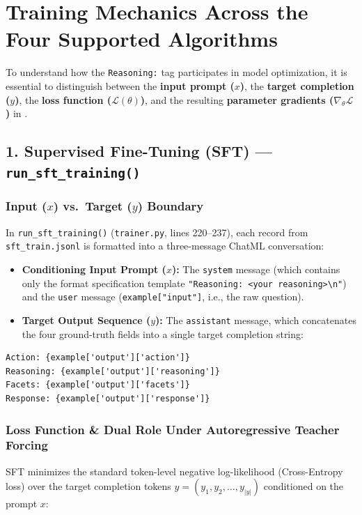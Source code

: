 \documentclass[10pt,letterpaper]{article}
\begin{document}
\section{Training Mechanics Across the Four Supported Algorithms}

To understand how the \texttt{Reasoning:} tag participates in model optimization, it is essential to distinguish between the \textbf{input prompt ($x$)}, the \textbf{target completion ($y$)}, the \textbf{loss function ($\mathcal{L}(\theta)$)}, and the resulting \textbf{parameter gradients ($\nabla_\theta \mathcal{L}$)} in .

\vspace{4pt}
\subsection{1. Supervised Fine-Tuning (SFT) --- \texttt{run\_sft\_training()}}

\subsubsection*{Input ($x$) vs.\ Target ($y$) Boundary}
In \texttt{run\_sft\_training()} (\texttt{trainer.py}, lines 220--237), each record from \texttt{sft\_train.jsonl} is formatted into a three-message ChatML conversation:
\begin{itemize}[leftmargin=18pt, itemsep=2pt]
    \item \textbf{Conditioning Input Prompt ($x$):} The \texttt{system} message (which contains only the format specification template \texttt{"Reasoning: <your reasoning>\textbackslash n"}) and the \texttt{user} message (\texttt{example["input"]}, i.e., the raw question).
    \item \textbf{Target Output Sequence ($y$):} The \texttt{assistant} message, which concatenates the four ground-truth fields into a single target completion string:
\end{itemize}
\begin{lstlisting}
Action: {example['output']['action']}
Reasoning: {example['output']['reasoning']}
Facets: {example['output']['facets']}
Response: {example['output']['response']}
\end{lstlisting}

\subsubsection*{Loss Function \& Dual Role Under Autoregressive Teacher Forcing}
SFT minimizes the standard token-level negative log-likelihood (Cross-Entropy loss) over the target completion tokens $y = (y_1, y_2, \dots, y_{|y|})$ conditioned on the prompt $x$:
\end{document}
